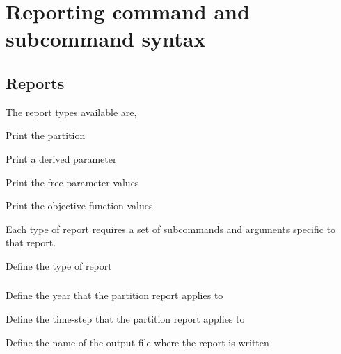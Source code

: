 \section{Reporting command and subcommand syntax\label{sec:report-syntax}}

\subsection{Reports}

The report types available are,

\begin{description}
  \item Print the partition
  \item Print a derived parameter
  \item Print the free parameter values
  \item Print the objective function values
\end{description}

Each type of report requires a set of subcommands and arguments specific to that report.


 {Define the type of report}

\subsubsection[Print the partition]{}

 {Define the year that the partition report applies to}

 {Define the time-step that the partition report applies to}

 {Define the name of the output file where the report is written}

\subsubsection[Print a derived parameter]{}

